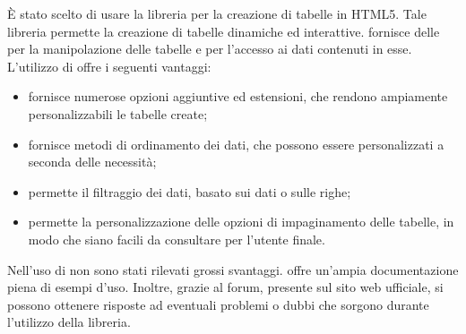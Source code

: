 È stato scelto di usare la libreria   per la creazione di tabelle in HTML5. Tale libreria permette la creazione di tabelle dinamiche ed interattive.  fornisce delle  per la manipolazione delle tabelle e per l'accesso ai dati contenuti in esse. 
L'utilizzo di  offre i seguenti vantaggi:
\begin{itemize}
\item fornisce numerose opzioni aggiuntive ed estensioni, che rendono ampiamente personalizzabili le tabelle create;
\item fornisce metodi di ordinamento dei dati, che possono essere personalizzati a seconda delle necessità;
\item permette il filtraggio dei dati, basato sui dati o sulle righe;
\item permette la personalizzazione delle opzioni di impaginamento delle tabelle, in modo che siano facili da consultare per l'utente finale.
\end{itemize}
Nell'uso di  non sono stati rilevati grossi svantaggi.  offre un'ampia documentazione piena di esempi d'uso. Inoltre, grazie al forum, presente sul sito web ufficiale, si possono ottenere risposte ad eventuali problemi o dubbi che sorgono durante l'utilizzo della libreria.


